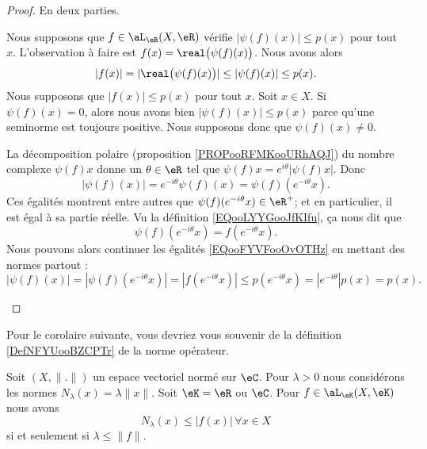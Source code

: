 	\begin{proof}
		En deux parties.
		\begin{subproof}
			\spitem[\( \Rightarrow\)]
			Nous supposons que \( f\in \aL_{\eR}(X,\eR)\) vérifie \( | \psi(f)(x) |\leq p(x)\) pour tout \( x\). L'observation à faire est \( f(x)=\real\big( \psi(f)(x) \big)\). Nous avons alors
			\begin{equation}
				| f(x) |=| \real\big( \psi(f)(x) \big) |\leq | \psi(f)(x) |\leq p(x).
			\end{equation}
			\spitem[\( \Leftarrow\)]
			Nous supposons que \( | f(x) |\leq p(x)\) pour tout \( x\). Soit \( x\in X\). Si \( \psi(f)(x)=0\), alors nous avons bien \( | \psi(f)(x) |\leq p(x)\) parce qu'une seminorme est toujours positive. Nous supposons donc que \( \psi(f)(x)\neq 0\).

			La décomposition polaire (proposition \ref{PROPooRFMKooURhAQJ}) du nombre complexe \( \psi(f)x\) donne un \( \theta\in \eR\) tel que \( \psi(f)x= e^{i\theta}| \psi(f)x |\). Donc
			\begin{equation}        \label{EQooFYVFooOvOTHz}
				| \psi(f)(x) |= e^{-i\theta}\psi(f)(x)=\psi(f)( e^{-i\theta}x).
			\end{equation}
			Ces égalités montrent entre autres que \( \psi(f)( e^{-i\theta}x)\in \eR^+\); et en particulier, il est égal à sa partie réelle. Vu la définition \eqref{EQooLYYGooJfKIfu}, ça nous dit que
			\begin{equation}
				\psi(f)( e^{-i\theta}x)=f( e^{-i\theta}x).
			\end{equation}
			Nous pouvons alors continuer les égalités \eqref{EQooFYVFooOvOTHz} en mettant des normes partout :
			\begin{equation}
				| \psi(f)(x) |=| \psi(f)( e^{-i\theta}x) |=| f( e^{-i\theta}x) |\leq p( e^{-i\theta}x)=|  e^{-i\theta} |p(x)=p(x).
			\end{equation}
		\end{subproof}
	\end{proof}

	Pour le corolaire suivante, vous devriez vous souvenir de la définition \ref{DefNFYUooBZCPTr} de la norme opérateur.

	\begin{corollary}        \label{CORooZEKAooENCDNJ}
		Soit \( (X,\| . \|)\) un espace vectoriel normé sur \( \eC\). Pour \( \lambda>0\) nous considérons les normes \( N_{\lambda}(x)=\lambda\| x \|\). Soit \( \eK=\eR\) ou \( \eC\). Pour \( f\in\aL_{\eK}(X,\eK)\) nous avons
		\begin{equation}
			N_{\lambda}(x)\leq | f(x) |\,\forall x\in X
		\end{equation}
		si et seulement si \( \lambda\leq \| f \|\).
	\end{corollary}

